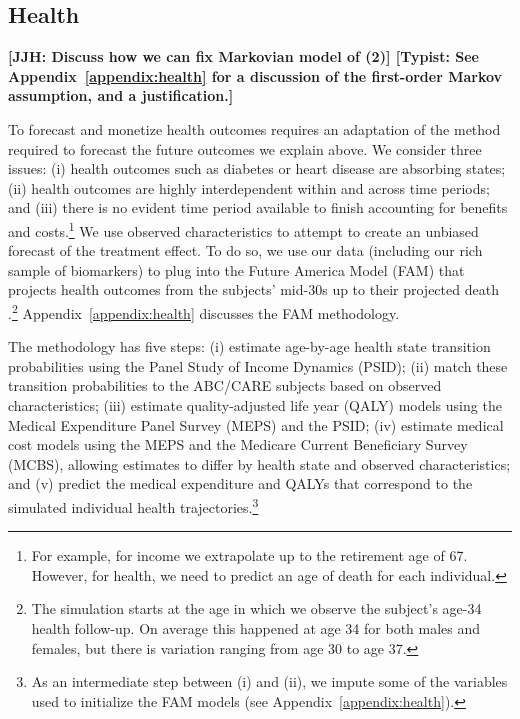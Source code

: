 \subsection{Health} \label{section:health}

\textbf{[JJH: Discuss how we can fix Markovian model of (2)] [Typist: See Appendix~\ref{appendix:health} for a discussion of the first-order Markov assumption, and a justification.]}

To forecast and monetize health outcomes requires an adaptation of the method required to forecast the future outcomes we explain above. We consider three issues: (i) health outcomes such as diabetes or heart disease are absorbing states; (ii) health outcomes are highly interdependent within and across time periods; and (iii) there is no evident time period available to finish accounting for benefits and costs.\footnote{For example, for income we extrapolate up to the retirement age of 67. However, for health, we need to predict an age of death for each individual.} We use observed characteristics to attempt to create an unbiased forecast of the treatment effect. To do so, we use our data (including our rich sample of biomarkers) to plug into the Future America Model (FAM) that projects health outcomes from the subjects' mid-30s up to their projected death \citep{Goldman_etal_2015_Future-Elderly-Model-Report}.\footnote{The simulation starts at the age in which we observe the subject's age-34 health follow-up. On average this happened at age 34 for both males and females, but there is variation ranging from age 30 to age 37.} Appendix~\ref{appendix:health} discusses the FAM methodology.

The methodology has five steps: (i) estimate age-by-age health state transition probabilities using the Panel Study of Income Dynamics (PSID); (ii) match these transition probabilities to the ABC/CARE subjects based on observed characteristics; (iii) estimate quality-adjusted life year (QALY) models using the Medical Expenditure Panel Survey (MEPS) and the PSID; (iv) estimate medical cost models using the MEPS and the Medicare Current Beneficiary Survey (MCBS), allowing estimates to differ by health state and observed characteristics; and (v) predict the medical expenditure and QALYs that correspond to the simulated individual health trajectories.\footnote{As an intermediate step between (i) and (ii), we impute some of the variables used to initialize the FAM models (see Appendix~\ref{appendix:health}).}

